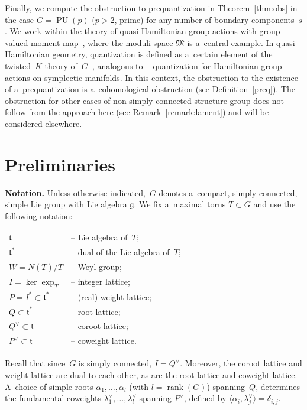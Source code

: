 \documentclass[pdftex]{sigma}
\numberwithin{equation}{section}
\DeclareMathOperator{\Spinc}{Spin^{c}}
\DeclareMathOperator{\rank}{rank}
\DeclareMathOperator{\PU}{PU}
\begin{document}
Finally, we compute the obstruction to prequantization in Theorem~\ref{thm:obs} in the case $G=\PU(p)$ ($p>2$, prime)
for any number of boundary components~$s$.
We work within the theory of quasi-Hamiltonian group actions with group-valued moment map~\cite{AMM}, where the moduli
space $\mathfrak{M}$ is a~central example.
In quasi-Hamiltonian geometry, quantization is def\/ined as a~certain element of the twisted~$K$-theory
of~$G$~\cite{Khomology}, analogous to $\Spinc$ quantization for Hamiltonian group actions on symplectic manifolds.
In this context, the obstruction to the existence of a~prequantization is a~cohomological obstruction (see
Def\/inition~\ref{preq}).
The obstruction for other cases of non-simply connected structure group does not follow from the approach here (see
Remark~\ref{remark:lament}) and will be considered elsewhere.

\section{Preliminaries}

{\bf Notation.}
Unless otherwise indicated,~$G$ denotes a~compact, simply connected, simple Lie group with Lie algebra $\mathfrak{g}$.
We f\/ix a~maximal torus $T\subset G$ and use the following notation:

\begin{tabular}{l@{\,\,}l} $\mathfrak{t}$ & -- Lie algebra of~$T$;
\\
$\mathfrak{t}^*$ & -- dual of the Lie algebra of~$T$;
\\
$W=N(T)/T$ & -- Weyl group;
\\
$I= \ker \exp_T$ & -- integer lattice;
\\
$P =I^*\subset \mathfrak{t}^*$ & -- (real) weight lattice;
\\
$Q \subset \mathfrak{t}^*$ & -- root lattice;
\\
$Q^\vee\subset \mathfrak{t}$ & -- coroot lattice;
\\
$P^\vee \subset \mathfrak{t}$ & -- coweight lattice.
\end{tabular}

Recall that since~$G$ is simply connected, $I=Q^\vee$.
Moreover, the coroot lattice and weight lattice are dual to each other, as are the root lattice and coweight lattice.
A~choice of simple roots $\alpha_1, \ldots, \alpha_l$ (with $l=\rank(G)$) spanning~$Q$, determines the fundamental
coweights $\lambda_1^\vee, \ldots, \lambda_l^\vee$ spanning $P^\vee$, def\/ined by $\langle\alpha_i,\lambda_j^\vee
\rangle=\delta_{i,j}$.
\end{document}

